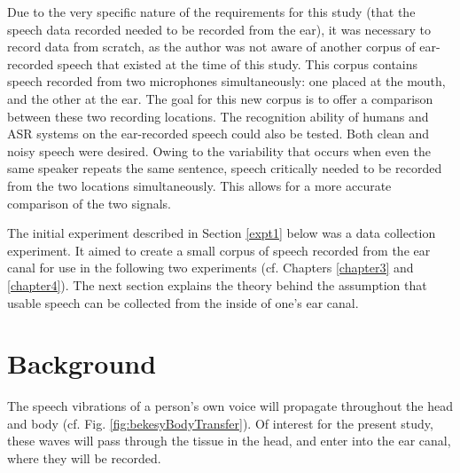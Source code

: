 Due to the very specific nature of the requirements for this study (that the speech data recorded needed to be recorded from the ear), it was necessary to record data from scratch, as the author was not aware of another corpus of ear-recorded speech that existed at the time of this study.  This corpus contains speech recorded from two microphones simultaneously: one placed at the mouth, and the other at the ear. The goal for this new corpus is to offer a comparison between these two recording locations. The recognition ability of humans and ASR systems on the ear-recorded speech could also be tested.  Both clean and noisy speech were desired.
Owing to the variability that occurs when even the same speaker repeats the same sentence, speech critically needed to be recorded from the two locations simultaneously.  This allows for a more accurate comparison of the two signals.

The initial experiment described in Section \ref{expt1} below was a data collection experiment.  It aimed to create a small corpus of speech recorded from the ear canal for use in the following two experiments (cf. Chapters \ref{chapter3} and \ref{chapter4}).  The next section explains the theory behind the assumption that usable speech can be collected from the inside of one's ear canal.

\section{Background}

The speech vibrations of a person's own voice will propagate throughout the head and body (cf. Fig. \ref{fig:bekesyBodyTransfer}).  Of interest for the present study, these waves will pass through the tissue in the head, and enter into the ear canal, where they will be recorded.

